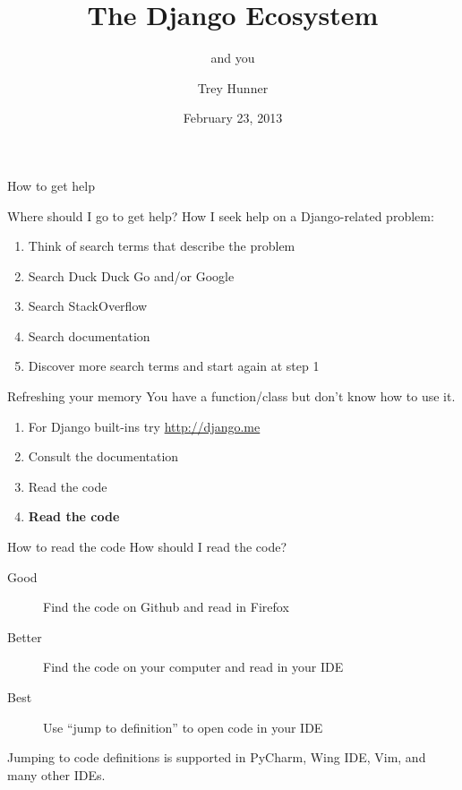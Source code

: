 \documentclass[xcolor=dvipsnames]{beamer}
\title{The Django Ecosystem}
\subtitle{and you}
\author{Trey Hunner}
\institute{Django Day}
\date{February 23, 2013}
\begin{document}
\begin{frame}[plain]
  \titlepage
\end{frame}

\begin{section}{How to get help}

  \begin{frame}{Where should I go to get help?}
    How I seek help on a Django-related problem:

    \begin{enumerate}
      \item Think of search terms that describe the problem
      \item Search Duck Duck Go and/or Google
      \item Search StackOverflow
      \item Search documentation
      \item Discover more search terms and start again at step 1
    \end{enumerate}
  \end{frame}

  \begin{frame}{Refreshing your memory}
    You have a function/class but don't know how to use it.

    \begin{enumerate}
      \item For Django built-ins try \href{https://github.com/jacobian/djangome\#readme}{http://django.me}
      \item Consult the documentation
      \item Read the code
      \pause
      \item \bf Read the code
    \end{enumerate}
  \end{frame}

  \begin{frame}{How to read the code}
    How should I read the code?

    \begin{description}
      \item[Good] Find the code on Github and read in Firefox
      \item[Better] Find the code on your computer and read in your IDE
      \item[Best] Use ``jump to definition'' to open code in your IDE
    \end{description}

    \pause
    Jumping to code definitions is supported in PyCharm, Wing IDE, Vim, and many other IDEs.
  \end{frame}

\end{section}
\end{document}
